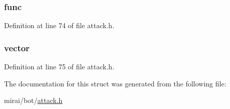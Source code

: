 \subsubsection[{\texorpdfstring{func}{func}}]{ func}\hypertarget{structattack__method_aebaf915269bb6b354f5e81bdb1153864}{}\label{structattack__method_aebaf915269bb6b354f5e81bdb1153864}


Definition at line 74 of file attack.\+h.

\subsubsection[{\texorpdfstring{vector}{vector}}]{ vector}\hypertarget{structattack__method_a5aff1489b7c5bb556d4931e452408bcf}{}\label{structattack__method_a5aff1489b7c5bb556d4931e452408bcf}


Definition at line 75 of file attack.\+h.



The documentation for this struct was generated from the following file\+:\begin{DoxyCompactItemize}
\item 
mirai/bot/\hyperlink{attack_8h}{attack.\+h}\end{DoxyCompactItemize}
